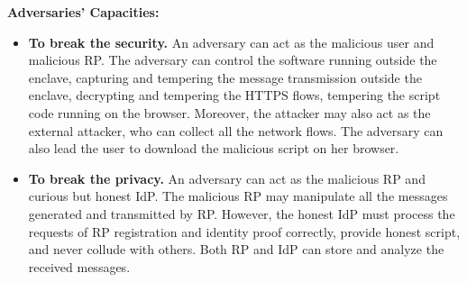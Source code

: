 \vspace{1mm}\noindent\textbf{Adversaries' Capacities: }
\begin{itemize}
\item \noindent\textbf{To break the security.}
An adversary can act as the malicious user and malicious RP. 
The adversary can control the software running outside the enclave, capturing and tempering the message transmission outside the enclave, decrypting and tempering the HTTPS flows, tempering the script code running on the browser. 
Moreover, the attacker may also act as the external attacker, who can collect all the network flows. The adversary can also lead the user to download the malicious script on her browser.

\item \noindent\textbf{To break the privacy.}
An adversary can act as the malicious RP and curious but honest IdP. 
The malicious RP may manipulate  all the messages generated and transmitted by RP.
However, the honest IdP must process the requests of RP registration and identity proof correctly, provide honest script, and never collude with others.
Both RP and IdP can store and analyze the received messages.

\end{itemize}

